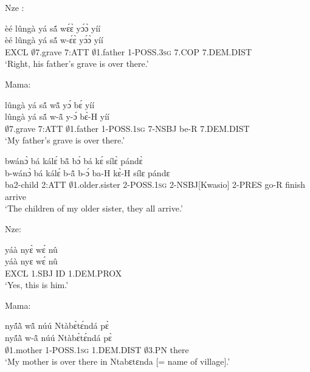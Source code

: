 \noindent Nze :

\begin{exe} 
\exC\label{168} 
  \glll  èé lûngà yá sã́ wɛ́ɛ̀ yɔ́ɔ̀ yíí \\
          èé lûngà yá sã́ w-ɛ́ɛ̀ yɔ́ɔ̀ yíí \\
           EXCL $\emptyset$7.grave 7:ATT $\emptyset$1.father 1-POSS.3\textsc{sg} 7.COP 7.DEM.DIST \\
    \trans `Right, his father's grave is over there.'
\end{exe}

\noindent Mama:

\begin{exe} 
\exC\label{169} 
  \glll  lûngà yá sã́ wã̂ yɔ́ bɛ́ yíí \\
         lûngà yá sã́ w-ã̂ y-ɔ́ bɛ̀-H yíí  \\
          $\emptyset$7.grave  7:ATT $\emptyset$1.father 1-POSS.1\textsc{sg} 7-NSBJ be-R 7.DEM.DIST \\
    \trans `My father's grave is over there.'
\end{exe}

\begin{exe} 
\exC\label{170}
  \glll  bwánɔ̀ bá kálɛ́ bã̂ bɔ́ bá kɛ́ sílɛ̀ pándɛ̀ \\
          b-wánɔ̀ bá kálɛ́ b-ã̂ b-ɔ́ ba-H kɛ̀-H sílɛ pándɛ \\
         ba2-child 2:ATT $\emptyset$1.older.sister 2-POSS.1\textsc{sg} 2-NSBJ[Kwasio] 2-PRES go-R finish arrive  \\
    \trans `The children of my older sister, they all arrive.'
\end{exe}

\noindent Nze:

\begin{exe} 
\exC\label{171} 
  \glll  yáà nyɛ̀ wɛ́ nû \\
         yáà nyɛ wɛ́ nû \\
         EXCL 1.SBJ ID 1.DEM.PROX  \\
    \trans `Yes, this is him.'
\end{exe}

\noindent Mama:

\begin{exe} 
\exC\label{172} 
  \glll  nyã́ã̀ wã̂ núú Ntàbɛ̀tɛ́ndá pɛ̀ \\
         nyã́ã̀ w-ã̂ núú Ntàbɛ̀tɛ́ndá pɛ̀ \\
          $\emptyset$1.mother 1-POSS.1\textsc{sg} 1.DEM.DIST $\emptyset$3.PN there  \\
    \trans `My mother is over there in Ntabɛtɛnda [= name of village].'
\end{exe}

